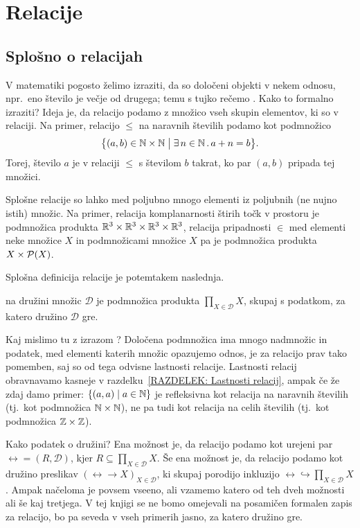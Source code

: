 \chapter{Relacije}\label{POGLAVJE: Relacije}

        \section{Splošno o relacijah}

                V matematiki pogosto želimo izraziti, da so določeni objekti v nekem odnosu, npr.~eno število je večje od drugega; temu s tujko rečemo . Kako to formalno izraziti? Ideja je, da relacijo podamo z množico vseh skupin elementov, ki so v relaciji. Na primer, relacijo $\leq$ na naravnih številih podamo kot podmnožico
                \[\set[1]{(a, b) \in \NN \times \NN}{\xsome{n}[\NN]{a + n = b}}.\]
                Torej, število $a$ je v relaciji $\leq$ s številom $b$ takrat, ko par $(a, b)$ pripada tej množici.

                Splošne relacije so lahko med poljubno mnogo elementi iz poljubnih (ne nujno istih) množic. Na primer, relacija komplanarnosti štirih točk v prostoru je podmnožica produkta $\mathbb{R}^3 \times \mathbb{R}^3 \times \mathbb{R}^3 \times \mathbb{R}^3$, relacija pripadnosti $\in$ med elementi neke množice $X$ in podmnožicami množice $X$ pa je podmnožica produkta $X \times \mathcal{P}(X)$.

                Splošna definicija relacije je potemtakem naslednja.
                \begin{definicija}
                         na družini množic $\mathscr{D}$ je podmnožica produkta $\prod_{X \in \mathscr{D}} X$, skupaj s podatkom, za katero družino $\mathscr{D}$ gre.
                \end{definicija}

                \begin{opomba}\label{OPOMBA: definicija relacij}
                        Kaj mislimo tu z izrazom ? Določena podmnožica ima mnogo nadmnožic in podatek, med elementi katerih množic opazujemo odnos, je za relacijo prav tako pomemben, saj so od tega odvisne lastnosti relacije. Lastnosti relacij obravnavamo kasneje v razdelku~\ref{RAZDELEK: Lastnosti relacij}, ampak če že zdaj damo primer: $\set{(a, a)}{a \in \NN}$ je refleksivna kot relacija na naravnih številih (tj.~kot podmnožica $\mathbb{N} \times \mathbb{N}$), ne pa tudi kot relacija na celih številih (tj.~kot podmnožica $\mathbb{Z} \times \mathbb{Z}$).

                        Kako  podatek o družini? Ena možnost je, da relacijo podamo kot urejeni par $\rel = (R, \mathscr{D})$, kjer $R \subseteq \prod_{X \in \mathscr{D}} X$. Še ena možnost je, da relacijo podamo kot družino preslikav $(\rel \to X)_{X \in \mathscr{D}}$, ki skupaj porodijo inkluzijo $\rel \hookrightarrow \prod_{X \in \mathscr{D}} X$. Ampak načeloma je povsem vseeno, ali vzamemo katero od teh dveh možnosti ali še kaj tretjega. V tej knjigi se ne bomo omejevali na posamičen formalen zapis za relacijo, bo pa seveda v vseh primerih jasno, za katero družino gre.
                \end{opomba}

